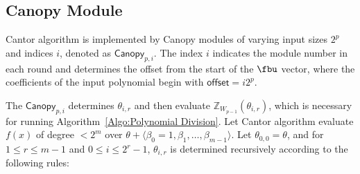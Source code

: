 \subsection{Canopy Module} \label{sec:Canopy}
Cantor algorithm is implemented by Canopy modules of varying input sizes $2^p$ and indices $i$, denoted as $\mathsf{Canopy}_{p, i}$. The index $i$ indicates the module number in each round and determines the offset from the start of the $\fbu$ vector, where the coefficients of the input polynomial begin with $\mathsf{offset} = i2^p$.


The $\mathsf{Canopy}_{p, i}$ determines $\theta_{i, r}$ and then evaluate $\mathbb{Z}_{W_{p-1}}(\theta_{i, r})$, which is necessary for running Algorithm~\ref{Algo:Polynomial Division}.  Let Cantor algorithm evaluate  $f(x)$ of degree $< 2^m$ over $\theta + \langle \beta_0 = 1, \beta_1, \ldots, \beta_{m-1} \rangle$.  
Let $\theta_{0, 0} = \theta$, and for $1 \leq r \leq m-1$ and $0 \leq i \leq 2^r - 1$, $\theta_{i, r}$ is determined recursively according to the following rules:


